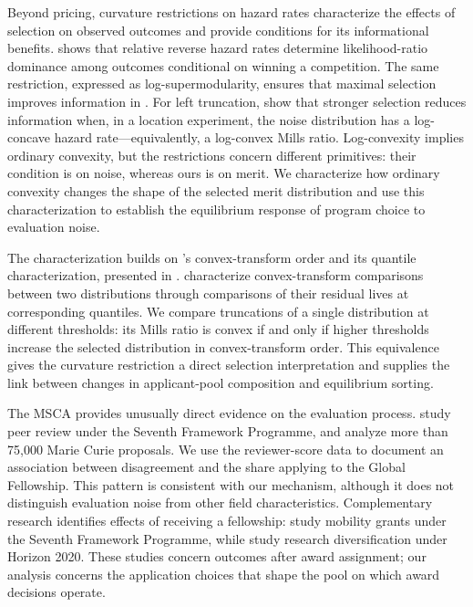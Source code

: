 \documentclass[12pt,reqno]{amsart}
\theoremstyle{definition}
\theoremstyle{plain} %
\begin{document}
\noindent Beyond pricing, curvature restrictions on hazard rates characterize the effects of selection on observed outcomes and provide conditions for its informational benefits. \citet{noe2020comparing} shows that relative reverse hazard rates determine likelihood-ratio dominance among outcomes conditional on winning a competition. The same restriction, expressed as log-supermodularity, ensures that maximal selection improves information in \citet*{ditillio2021strategic}. For left truncation, \citeauthor*{ditillio2021strategic} show that stronger selection reduces information when, in a location experiment, the noise distribution has a log-concave hazard rate—equivalently, a log-convex Mills ratio. Log-convexity implies ordinary convexity, but the restrictions concern different primitives: their condition is on noise, whereas ours is on merit. We characterize how ordinary convexity changes the shape of the selected merit distribution and use this characterization to establish the equilibrium response of program choice to evaluation noise.

\noindent The characterization builds on \cite{vanzwet1964convex}'s convex-transform order and its quantile characterization, presented in \citet[Section 4.B]{shaked2007stochastic}. \citet*{arriaza2017comparing} characterize convex-transform comparisons between two distributions through comparisons of their residual lives at corresponding quantiles. We compare truncations of a single distribution at different thresholds: its Mills ratio is convex if and only if higher thresholds increase the selected distribution in convex-transform order. This equivalence gives the curvature restriction a direct selection interpretation and supplies the link between changes in applicant-pool composition and equilibrium sorting.

The MSCA provides unusually direct evidence on the evaluation process. \citet*{pina2015peer} study peer review under the Seventh Framework Programme, and \citet*{pina2021retrospective} analyze more than 75,000 Marie Curie proposals. We use the reviewer-score data to document an association between disagreement and the share applying to the Global Fellowship. This pattern is consistent with our mechanism, although it does not distinguish evaluation noise from other field characteristics. Complementary research identifies effects of receiving a fellowship: \citet*{baruffaldi2026mobility} study mobility grants under the Seventh Framework Programme, while \citet*{yildiz2024expanding} study research diversification under Horizon 2020. These studies concern outcomes after award assignment; our analysis concerns the application choices that shape the pool on which award decisions operate.
\end{document}
